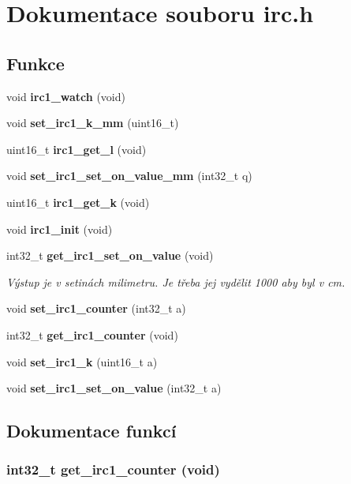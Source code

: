 \section{Dokumentace souboru irc.h}
\label{irc_8h}
\subsection*{Funkce}
\begin{DoxyCompactItemize}
\item 
void {\bf irc1\_\-watch} (void)
\item 
void {\bf set\_\-irc1\_\-k\_\-mm} (uint16\_\-t)
\item 
uint16\_\-t {\bf irc1\_\-get\_\-l} (void)
\item 
void {\bf set\_\-irc1\_\-set\_\-on\_\-value\_\-mm} (int32\_\-t q)
\item 
uint16\_\-t {\bf irc1\_\-get\_\-k} (void)
\item 
void {\bf irc1\_\-init} (void)
\item 
int32\_\-t {\bf get\_\-irc1\_\-set\_\-on\_\-value} (void)
\begin{DoxyCompactList}\small\item\em Výstup je v setinách milimetru. Je třeba jej vydělit 1000 aby byl v cm. \item\end{DoxyCompactList}\item 
void {\bf set\_\-irc1\_\-counter} (int32\_\-t a)
\item 
int32\_\-t {\bf get\_\-irc1\_\-counter} (void)
\item 
void {\bf set\_\-irc1\_\-k} (uint16\_\-t a)
\item 
void {\bf set\_\-irc1\_\-set\_\-on\_\-value} (int32\_\-t a)
\end{DoxyCompactItemize}


\subsection{Dokumentace funkcí}
\subsubsection[{get\_\-irc1\_\-counter}]{\setlength{\rightskip}{0pt plus 5cm}int32\_\-t get\_\-irc1\_\-counter (void)}\label{irc_8h_a36575a375721a5efe36822edac5e7aec}
